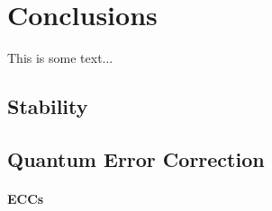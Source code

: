 
\chapter{Conclusions}
\label{chap:conclusion}
%

This is some text...

\section{Stability}


\section{Quantum Error Correction}

\subsubsection{ECCs}
